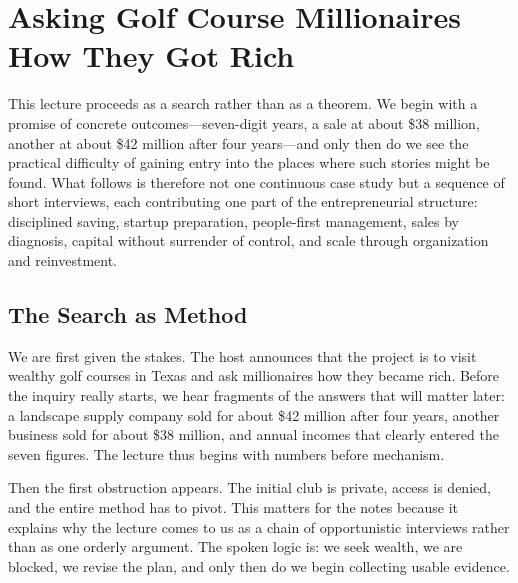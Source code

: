\chapter{Asking Golf Course Millionaires How They Got Rich}

This lecture proceeds as a search rather than as a theorem. We begin with a promise of concrete outcomes---seven-digit years, a sale at about \$38 million, another at about \$42 million after four years---and only then do we see the practical difficulty of gaining entry into the places where such stories might be found. What follows is therefore not one continuous case study but a sequence of short interviews, each contributing one part of the entrepreneurial structure: disciplined saving, startup preparation, people-first management, sales by diagnosis, capital without surrender of control, and scale through organization and reinvestment.

\section{The Search as Method}

We are first given the stakes. The host announces that the project is to visit wealthy golf courses in Texas and ask millionaires how they became rich. Before the inquiry really starts, we hear fragments of the answers that will matter later: a landscape supply company sold for about \$42 million after four years, another business sold for about \$38 million, and annual incomes that clearly entered the seven figures. The lecture thus begins with numbers before mechanism.

Then the first obstruction appears. The initial club is private, access is denied, and the entire method has to pivot. This matters for the notes because it explains why the lecture comes to us as a chain of opportunistic interviews rather than as one orderly argument. The spoken logic is: we seek wealth, we are blocked, we revise the plan, and only then do we begin collecting usable evidence.

